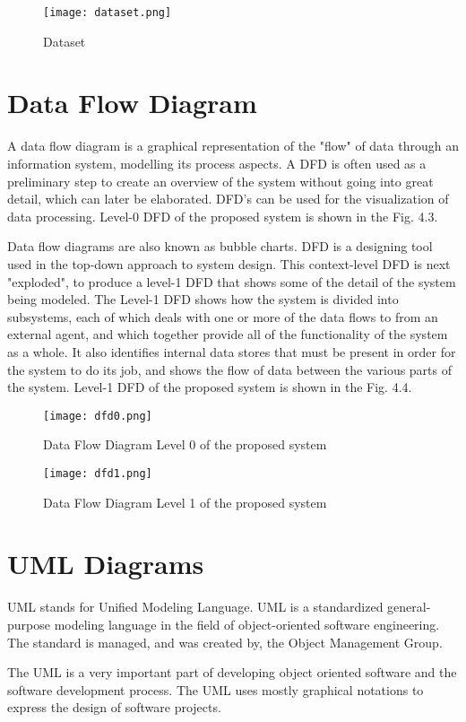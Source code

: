 \begin{center}
\begin{figure}[H]
\centering
\texttt{[image: dataset.png]}
\caption{Dataset}
\end{figure}
\end{center}
\section{Data Flow Diagram}
A data flow diagram is a graphical representation of the "flow" of data through an information system, modelling its process aspects. A DFD is often used as a preliminary step to create an overview of the system without going into great detail, which can later be elaborated. DFD's can be used for the visualization of data processing. Level-0 DFD of the proposed system is shown in the Fig. 4.3.
\par
Data flow diagrams are also known as bubble charts. DFD is a designing tool used in the top-down approach to system design. This context-level DFD is next "exploded", to produce a level-1 DFD that shows some of the detail of the system being modeled. The Level-1 DFD shows how the system is divided into subsystems, each of which deals with one or more of the data flows to from an external agent, and which together provide all of the functionality of the system as a whole. It also identifies internal data stores that must be present in order for the system to do its job, and shows the flow of data between the various parts of the system. Level-1 DFD of the proposed system is shown in the Fig. 4.4.

\begin{center}
\begin{figure}[H]
\centering
\texttt{[image: dfd0.png]}
\caption{Data Flow Diagram Level 0 of the proposed system}
\end{figure}
\end{center}

\begin{center}
\begin{figure}[H]
\centering
\texttt{[image: dfd1.png]}
\caption{Data Flow Diagram Level 1 of the proposed system}
\end{figure}
\end{center}

\section{UML Diagrams}
UML stands for Unified Modeling Language. UML is a standardized general-purpose modeling language in the field of object-oriented software engineering. The standard is managed, and was created by, the Object Management Group. 
\par
The UML is a very important part of developing object oriented software and the software development process. The UML uses mostly graphical notations to express the design of software projects.\\
